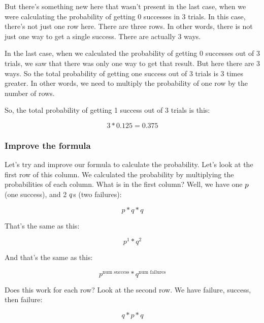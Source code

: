 \documentclass[../../../main.tex]{subfiles}
\begin{document}
\noindent
But there's something new here that wasn't present in the last case, when we were calculating the probability of getting 0 successes in 3 trials. In this case, there's not just one row here. There are three rows. In other words, there is not just one way to get a single success. There are actually 3 ways. 

In the last case, when we calculated the probability of getting 0 successes out of 3 trials, we saw that there was only one way to get that result. But here there are 3 ways. So the total probability of getting one success out of 3 trials is 3 times greater. In other words, we need to multiply the probability of one row by the number of rows.

So, the total probability of getting 1 success out of 3 trials is this:

\begin{equation*}
    3 * 0.125 = 0.375
\end{equation*}


\subsubsection{Improve the formula}

Let's try and improve our formula to calculate the probability. Let's look at the first row of this column. We calculated the probability by multiplying the probabilities of each column. What is in the first column? Well, we have one $\success/$ (one success), and 2 $\failure/$s (two failures):

\begin{equation*}
    p * q * q
\end{equation*}

That's the same as this:

\begin{equation*}
   p^{1} * q^{2}
\end{equation*}

And that's the same as this:

\begin{equation*}
   p^{\text{num success}} * q^{\text{num failures}}
\end{equation*}

Does this work for each row? Look at the second row. We have failure, success, then failure:

\begin{equation*}
   q * p * q
\end{equation*}
\end{document}
